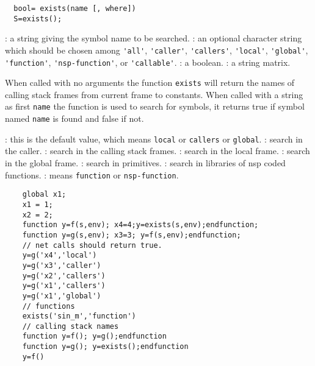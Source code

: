 \begin{mandesc}
\end{mandesc}
\begin{calling_sequence}
\begin{verbatim}
  bool= exists(name [, where])
  S=exists();
\end{verbatim}
\end{calling_sequence}
\begin{parameters}
  \begin{varlist}
    : a string giving the symbol name to be searched.
    : an optional character string which should be chosen 
    among \verb+'all'+, \verb+'caller'+, \verb+'callers'+, \verb+'local'+,
    \verb+'global'+, \verb+'function'+, \verb+'nsp-function'+, or 
    \verb+'callable'+.
    : a boolean. 
    : a string matrix.
  \end{varlist}
\end{parameters}
\begin{mandescription}
  When called with no arguments the function \verb+exists+ will return 
  the names of calling stack frames from current frame to constants. 
  When called with a string as first \verb+name+ the function is 
  used to search for symbols, it returns true if 
  symbol named \verb+name+ is found and false if not. 
  \begin{varlist}
    : this is the default value, which  means \verb+local+ or 
    \verb+callers+ or \verb+global+.
    :  search in the caller. 
    : search in the calling stack frames.
    : search in the local frame.
    : search in the global frame.
    : search in primitives. 
    : search in libraries of nsp coded functions.
    : means \verb+function+ or \verb+nsp-function+.
  \end{varlist}
\end{mandescription}
\begin{examples}
  \begin{Verbatim}
    global x1;
    x1 = 1;
    x2 = 2;
    function y=f(s,env); x4=4;y=exists(s,env);endfunction;
    function y=g(s,env); x3=3; y=f(s,env);endfunction;
    // net calls should return true.
    y=g('x4','local')
    y=g('x3','caller')
    y=g('x2','callers')
    y=g('x1','callers')
    y=g('x1','global')
    // functions 
    exists('sin_m','function')
    // calling stack names 
    function y=f(); y=g();endfunction 
    function y=g(); y=exists();endfunction 
    y=f()
  \end{Verbatim}
\end{examples}
\begin{manseealso}
\end{manseealso}
